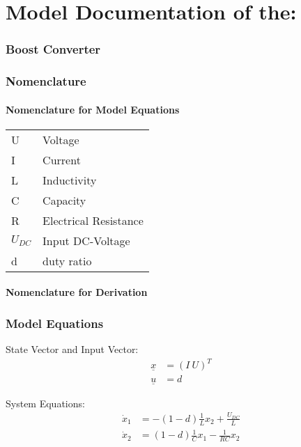 \documentclass[10pt,a4paper]{article}
\begin{document}
	\part*{Model Documentation of the:}
	\section*{Boost Converter} %
	
	
	\section{Nomenclature} %
	\subsection{Nomenclature for Model Equations} %
	
	\begin{tabular}{ll}
		U & Voltage \\
		I & Current \\
		L & Inductivity \\
		C & Capacity \\
		R & Electrical Resistance \\
		$U_{DC}$ & Input DC-Voltage \\
		d & duty ratio		
	\end{tabular}
	
	\subsection{Nomenclature for Derivation} %
	
	
	\section{Model Equations} %
	
	State Vector and Input Vector:
	\begin{align*}
		\underline{x} &= (I \ U )^T \\
		\underline{u} &= d
	\end{align*}
	
	\noindent System Equations:	
	\begin{subequations}
	\begin{align}
		\dot{x}_1 &= -(1 - d) \frac{1}{L} x_2 + \frac{U_{DC}}{L}\\    
		\dot{x}_2 &= (1 - d) \frac{1}{C} x_1 - \frac{1}{RC} x_2  
	\end{align}
	\end{subequations}
\end{document}
